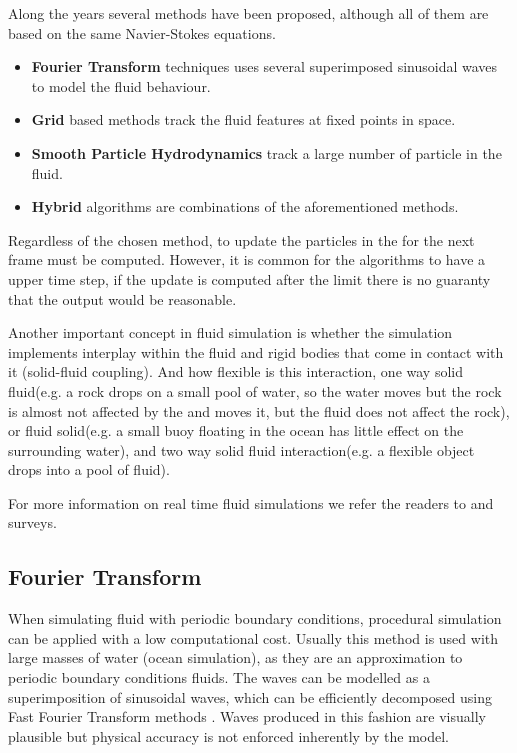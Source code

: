 Along the years several methods have been proposed, although all of them are based on the same Navier-Stokes equations.

\begin{itemize}
\item \textbf{Fourier Transform} techniques uses several superimposed sinusoidal waves to model the fluid behaviour.
\item \textbf{Grid} based methods track the fluid features at fixed points in space.
\item \textbf{Smooth Particle Hydrodynamics} track a large number of particle in the fluid.
\item \textbf{Hybrid} algorithms are combinations of the aforementioned methods.
\end{itemize}

Regardless of the chosen method, to update the particles in the for the next frame must be computed.
However, it is common for the algorithms to have a upper time step, if the update is computed after the limit there is no guaranty that the output would be reasonable.

Another important concept in fluid simulation is whether the simulation implements interplay within the fluid and rigid bodies that come in contact with it (solid-fluid coupling).
And how flexible is this interaction, one way solid fluid(e.g. a rock drops on a small pool of water, so the water moves but the rock is almost not affected by the  and moves it, but the fluid does not affect the rock), or fluid solid(e.g. a small buoy floating in the ocean has little effect on the surrounding water), and two way solid fluid interaction(e.g. a flexible object drops into a pool of fluid).

For more information on real time fluid simulations we refer the readers to \cite{Vines2012} and \cite{Ihmsen2014} surveys.

\subsection{Fourier Transform}

When simulating fluid with periodic boundary conditions, procedural simulation can be applied with a low computational cost.
Usually this method is used with large masses of water (ocean simulation), as they are an approximation to periodic boundary conditions fluids.
The waves can be modelled as a superimposition of sinusoidal waves, which can be efficiently decomposed using Fast Fourier Transform methods \cite{Mastin1987}.
Waves produced in this fashion are visually plausible but physical accuracy is not enforced inherently by the model.

